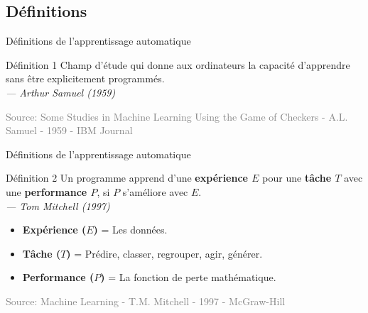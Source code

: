 \documentclass[10pt]{beamer}  %
\begin{document}

\subsection[Définitions]{Définitions}

\begin{frame}{Définitions de l'apprentissage automatique}
	\begin{block}{Définition 1}
		Champ d'étude qui donne aux ordinateurs la capacité d'apprendre sans être explicitement programmés. \\
		\hfill
		\textit{--- Arthur Samuel (1959)}
	\end{block}
	\vfill
	\tiny \textcolor{gray}{Source: Some Studies in Machine Learning Using the Game of Checkers - A.L. Samuel - 1959 - IBM Journal}
\end{frame}

\begin{frame}{Définitions de l'apprentissage automatique}
	\begin{block}{Définition 2}
		Un programme apprend d'une \textbf{expérience $E$} pour une \textbf{tâche $T$} avec une \textbf{performance $P$}, si $P$ s'améliore avec $E$. \\
		\hfill 
		\textit{--- Tom Mitchell (1997)}
	\end{block}
	\begin{itemize}
		\item \textbf{Expérience ($E$)} = Les données.
		\item \textbf{Tâche ($T$)} = Prédire, classer, regrouper, agir, générer.
		\item \textbf{Performance ($P$)} = La fonction de perte mathématique.
	\end{itemize}
	\vfill 
	\tiny \textcolor{gray}{Source: Machine Learning - T.M. Mitchell - 1997 - McGraw-Hill}
\end{frame}
\end{document}
